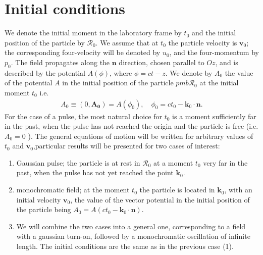 


\section{Initial conditions}
We denote the initial moment in the laboratory frame by $t_{0}$ and the initial position of the particle by $\boldsymbol{\mathcal { R }}_{0}$. We assume that at $t_{0}$ the particle velocity is $\mathbf{v}_{0}$; the corresponding four-velocity will be denoted by $u_{0}$, and the four-momentum by $p_{0}$. The field propagates along the $\mathbf{n}$ direction, chosen parallel to $O z$, and is described by the potential $A(\phi)$, where $\phi=c t-z$. We denote by $A_{0}$ the value of the potential $A$ in the initial position of the particle $p m b \mathcal{R}_{0}$ at the initial moment $t_{0}$ i.e.
\begin{align}
  A_{0} \equiv\left(0, \mathbf{A}_{\mathbf{0}}\right)=A\left(\phi_{0}\right), \quad \phi_{0}=c t_{0}-\mathbf{k}_{0} \cdot \mathbf{n} . \label{II.2.2.1}
\end{align}
For the case of a pulse, the most natural choice for $t_{0}$ is a moment sufficiently far in the past, when the pulse has not reached the origin and the particle is free (i.e. $A_{0}=0$ ). The general equations of motion will be written for arbitrary values of $t_{0}$ and $\mathbf{v}_{0}$,particular results will be presented for two cases of interest:
\begin{enumerate}
  \item Gaussian pulse; the particle is at rest in $\boldsymbol{\mathcal { R }}_{0}$ at a moment $t_{0}$ very far in the past, when the pulse has not yet reached the point $\boldsymbol{k}_{0}$.
  \item monochromatic field; at the moment $t_{0}$ the particle is located in $\mathbf{k}_{0}$, with an initial velocity $\mathbf{v}_{0}$, the value of the vector potential in the initial position of the particle being $A_{0}=A\left(c t_{0}-\mathbf{k}_{0} \cdot \mathbf{n}\right)$.
  \item We will combine the two cases into a general one, corresponding to a field with a gaussian turn-on, followed by a monochromatic oscillation of infinite length. The initial conditions are the same as in the previous case (1).
\end{enumerate}

